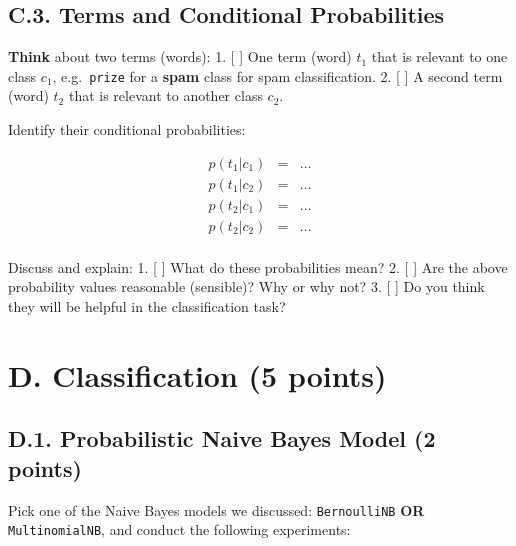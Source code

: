 \documentclass[
  letterpaper,
]{scrbook}
\begin{document}
\subsection*{C.3. Terms and Conditional
Probabilities}\label{c.3.-terms-and-conditional-probabilities}

\textbf{Think} about two terms (words): 1. {[} {]} One term (word)
\(t_1\) that is relevant to one class \(c_1\), e.g.~\texttt{prize} for a
\textbf{spam} class for spam classification. 2. {[} {]} A second term
(word) \(t_2\) that is relevant to another class \(c_2\).

Identify their conditional probabilities:

\begin{eqnarray}
p(t_1|c_1) & = & ... \\
p(t_1|c_2) & = & ... \\
p(t_2|c_1) & = & ... \\
p(t_2|c_2) & = & ... \\
\end{eqnarray}

Discuss and explain: 1. {[} {]} What do these probabilities mean? 2. {[}
{]} Are the above probability values reasonable (sensible)? Why or why
not? 3. {[} {]} Do you think they will be helpful in the classification
task?

\section*{D. Classification (5
points)}\label{d.-classification-5-points}


\subsection*{D.1. Probabilistic Naive Bayes Model (2
points)}\label{d.1.-probabilistic-naive-bayes-model-2-points}

Pick one of the Naive Bayes models we discussed: \texttt{BernoulliNB}
\textbf{OR} \texttt{MultinomialNB}, and conduct the following
experiments:
\end{document}
